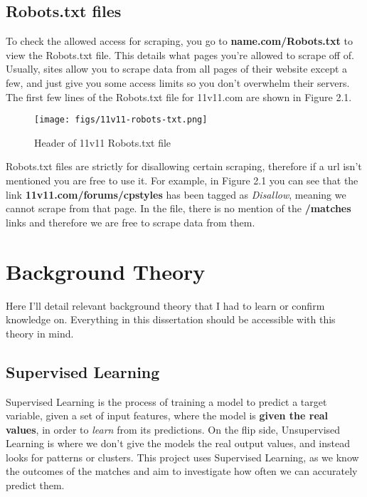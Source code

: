\documentclass[12pt,a4paper,twoside,openright]{report}
\begin{document}
\subsection{Robots.txt files}

To check the allowed access for scraping, you go to \textbf{name.com/Robots.txt} to view the Robots.txt file. This details what pages you're allowed to scrape off of. Usually, sites allow you to scrape data from all pages of their website except a few, and just give you some access limits so you don't overwhelm their servers. The first few lines of the Robots.txt file for 11v11.com are shown in Figure 2.1.

\begin{figure}
  \centering
  \texttt{[image: figs/11v11-robots-txt.png]}
  \caption{Header of 11v11 Robots.txt file}
  \label{fig:11v11-robots-txt}
\end{figure}

Robots.txt files are strictly for disallowing certain scraping, therefore if a url isn't mentioned you are free to use it. For example, in Figure 2.1 you can see that the link \textbf{11v11.com/forums/cpstyles} has been tagged as \textit{Disallow}, meaning we cannot scrape from that page. In the file, there is no mention of the \textbf{/matches} links and therefore we are free to scrape data from them.

\section{Background Theory}

Here I'll detail relevant background theory that I had to learn or confirm knowledge on. Everything in this dissertation should be accessible with this theory in mind.

\subsection{Supervised Learning}

Supervised Learning is the process of training a model to predict a target variable, given a set of input features, where the model is \textbf{given the real values}, in order to \textit{learn} from its predictions. On the flip side, Unsupervised Learning is where we don't give the models the real output values, and instead looks for patterns or clusters. This project uses Supervised Learning, as we know the outcomes of the matches and aim to investigate how often we can accurately predict them.
\end{document}

